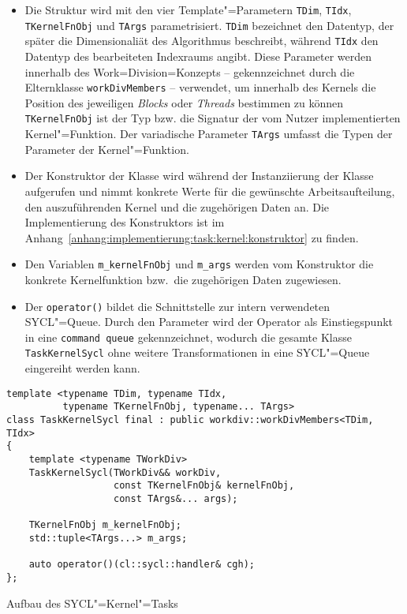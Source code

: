 \begin{itemize}
    \item Die Struktur wird mit den vier Template"=Parametern \texttt{TDim},
          \texttt{TIdx}, \texttt{TKernelFnObj} und \texttt{TArgs}
          parametrisiert. \texttt{TDim} bezeichnet den Datentyp, der später die
          Dimensionaliät des Algorithmus beschreibt, während \texttt{TIdx} den
          Datentyp des bearbeiteten Indexraums angibt. Diese Parameter werden
          innerhalb des Work=Division=Konzepts -- gekennzeichnet durch die
          Elternklasse \texttt{workDivMembers} -- verwendet, um innerhalb des
          Kernels die Position des jeweiligen \textit{Blocks} oder
          \textit{Threads} bestimmen zu können \texttt{TKernelFnObj} ist der Typ
          bzw. die Signatur der vom Nutzer implementierten Kernel"=Funktion. Der
          variadische Parameter \texttt{TArgs} umfasst die Typen der Parameter
          der Kernel"=Funktion.
    \item Der Konstruktor der Klasse wird während der Instanziierung der Klasse
          aufgerufen und nimmt konkrete Werte für die gewünschte
          Arbeitsaufteilung, den auszuführenden Kernel und die zugehörigen Daten
          an. Die Implementierung des Konstruktors ist im
          Anhang~\ref{anhang:implementierung:task:kernel:konstruktor} zu finden.
    \item Den Variablen \texttt{m\_kernelFnObj} und \texttt{m\_args} werden vom
          Konstruktor die konkrete Kernelfunktion bzw.\ die zugehörigen Daten
          zugewiesen.
    \item Der \texttt{operator()} bildet die Schnittstelle zur intern
          verwendeten SYCL"=Queue. Durch den Parameter wird der Operator als
          Einstiegspunkt in eine \texttt{command queue} gekennzeichnet, wodurch
          die gesamte Klasse \texttt{TaskKernelSycl} ohne weitere
          Transformationen in eine SYCL"=Queue eingereiht werden kann.
\end{itemize}

\begin{code}
    \begin{verbatim}
template <typename TDim, typename TIdx,
          typename TKernelFnObj, typename... TArgs>
class TaskKernelSycl final : public workdiv::workDivMembers<TDim, TIdx>
{
    template <typename TWorkDiv>
    TaskKernelSycl(TWorkDiv&& workDiv,
                   const TKernelFnObj& kernelFnObj,
                   const TArgs&... args);

    TKernelFnObj m_kernelFnObj;
    std::tuple<TArgs...> m_args;

    auto operator()(cl::sycl::handler& cgh);
};
    \end{verbatim}
    \caption{Aufbau des SYCL"=Kernel"=Tasks}
    \label{implementierung:task:kernel:struktur}
\end{code}

